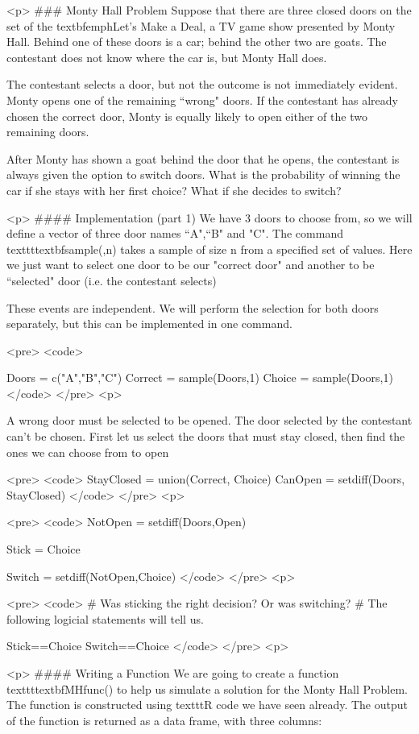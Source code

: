 

<p>
### {Monty Hall Problem}
Suppose that there are three closed doors on the set of the  textbf{emph{Let's Make a Deal}}, a TV game show presented by Monty Hall. Behind one of these doors is a car; behind the other two are goats. The contestant does not know where the car is, but Monty Hall does.

The contestant selects a door, but not the outcome is not immediately evident. Monty opens one of the remaining ``wrong" doors. If the contestant has already chosen the correct door, Monty is equally likely to open either of the two remaining doors.

After Monty has shown a goat behind the door that he opens, the contestant is always given the option to switch doors. What is the probability of winning the car if she stays with her first choice? What if she decides to switch?


<p>
#### {Implementation (part 1)}
We have 3 doors to choose from, so we will define a vector of three door names ``A",``B" and "C". The command texttt{textbf{sample(,n)}} takes a sample of size n from a specified set of values. Here we just want to select one door to be our "correct door" and another to be ``selected" door (i.e. the contestant selects)

These events are independent. We will perform the selection for both doors separately, but this can be implemented in one command.


<pre>
<code>

Doors = c("A","B","C")
Correct = sample(Doors,1)
Choice = sample(Doors,1)
</code> 
</pre>
<p>

A wrong door must be selected to be opened. The door selected by the contestant can't be chosen. First let us select the doors that must stay closed, then find the ones we can choose from to open

<pre>
<code>
StayClosed = union(Correct, Choice)
CanOpen = setdiff(Doors, StayClosed)
</code> 
</pre>
<p>


<pre>
<code>
NotOpen = setdiff(Doors,Open)

Stick = Choice        
   
Switch = setdiff(NotOpen,Choice)
</code> 
</pre>
<p>


<pre>
	<code>
# Was sticking the right decision? Or was switching?
# The following logicial statements  will tell us.

Stick==Choice
Switch==Choice
</code> 
</pre>
<p>


<p>
#### {Writing a Function}
We are going to create a function texttt{textbf{MHfunc()}} to help us simulate a solution for the Monty Hall Problem. The function is constructed using texttt{R} code we have seen already. The output of the function is returned as a data frame, with three columns:
 
